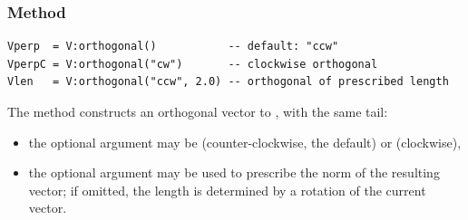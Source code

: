 \subsubsection{Method  }
\label{ssub:method_vector_orthogonal_r}

\begin{verbatim}
Vperp  = V:orthogonal()           -- default: "ccw"
VperpC = V:orthogonal("cw")       -- clockwise orthogonal
Vlen   = V:orthogonal("ccw", 2.0) -- orthogonal of prescribed length
\end{verbatim}

The  method constructs an orthogonal vector to ,
with the same tail:
\begin{itemize}
  \item the optional argument  may be  (counter-clockwise,
        the default) or  (clockwise),
  \item the optional argument  may be used to prescribe the norm
        of the resulting vector; if omitted, the length is determined by a rotation
        of the current vector.
\end{itemize}


\begin{tkzexample}[latex=.5\textwidth]
\begin{center}
\end{center}
\end{tkzexample}



\endinput